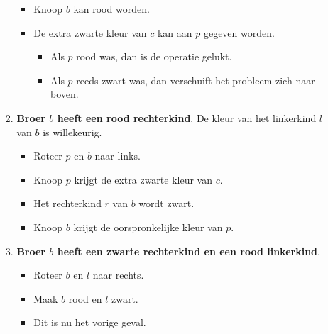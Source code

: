 \begin{itemize}
\begin{enumerate}
\begin{enumerate}
\begin{itemize}
                \item Knoop $b$ kan rood worden.
                \item De extra zwarte kleur van $c$ kan aan $p$ gegeven worden.
                \begin{itemize}
                    \item Als $p$ rood was, dan is de operatie gelukt.
                    \item Als $p$ reeds zwart was, dan verschuift het probleem zich naar boven.
                \end{itemize}
            \end{itemize}
            \item \textbf{Broer $b$ heeft een rood rechterkind}. De kleur van het linkerkind $l$ van $b$ is willekeurig.
            \begin{itemize}
                \item Roteer $p$ en $b$ naar links.
                \item Knoop $p$ krijgt de extra zwarte kleur van $c$.
                \item Het rechterkind $r$ van $b$ wordt zwart.
                \item Knoop $b$ krijgt de oorspronkelijke kleur van $p$.
            \end{itemize}
            \item \textbf{Broer $b$ heeft een zwarte rechterkind en een rood linkerkind}.
            \begin{itemize}
                \item Roteer $b$ en $l$ naar rechts.
                \item Maak $b$ rood en $l$ zwart.
                \item Dit is nu het vorige geval.
            \end{itemize}
        \end{enumerate}

\end{enumerate}
\end{itemize}
